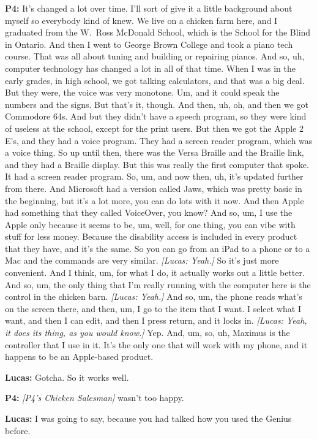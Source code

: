 \textbf{P4:} It's changed a lot over time. I'll sort of give it a little background about myself so everybody kind of knew. We live on a chicken farm here, and I graduated from the W.\ Ross McDonald School, which is the School for the Blind in Ontario. And then I went to George Brown College and took a piano tech course. That was all about tuning and building or repairing pianos. And so, uh, computer technology has changed a lot in all of that time. When I was in the early grades, in high school, we got talking calculators, and that was a big deal. But they were, the voice was very monotone. Um, and it could speak the numbers and the signs. But that's it, though. And then, uh, oh, and then we got Commodore 64s. And but they didn't have a speech program, so they were kind of useless at the school, except for the print users. But then we got the Apple 2 E's, and they had a voice program. They had a screen reader program, which was a voice thing. So up until then, there was the Versa Braille and the Braille link, and they had a Braille display. But this was really the first computer that spoke. It had a screen reader program. So, um, and now then, uh, it's updated further from there. And Microsoft had a version called Jaws, which was pretty basic in the beginning, but it's a lot more, you can do lots with it now. And then Apple had something that they called VoiceOver, you know? And so, um, I use the Apple only because it seems to be, um, well, for one thing, you can vibe with stuff for less money. Because the disability access is included in every product that they have, and it's the same. So you can go from an iPad to a phone or to a Mac and the commands are very similar. \textit{[Lucas: Yeah.]} So it's just more convenient. And I think, um, for what I do, it actually works out a little better. And so, um, the only thing that I'm really running with the computer here is the control in the chicken barn. \textit{[Lucas: Yeah.]} And so, um, the phone reads what's on the screen there, and then, um, I go to the item that I want. I select what I want, and then I can edit, and then I press return, and it locks in. \textit{[Lucas: Yeah, it does its thing, as you would know.]} Yep. And, um, so, uh, Maximus is the controller that I use in it. It's the only one that will work with my phone, and it happens to be an Apple-based product.

\textbf{Lucas:} Gotcha. So it works well.

\textbf{P4:} \textit{[P4's Chicken Salesman]} wasn't too happy.

\textbf{Lucas:} I was going to say, because you had talked how you used the Genius before.

